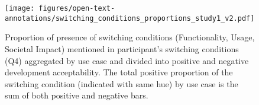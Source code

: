 \begin{figure}[!hptb]
    \centering
    \texttt{[image: figures/open-text-annotations/switching\_conditions\_proportions\_study1\_v2.pdf]}
    \caption{Proportion of presence of switching conditions (Functionality, Usage, Societal Impact) mentioned in participant's switching conditions (Q4) aggregated by use case and divided into positive and negative development acceptability. The total positive proportion of the switching condition (indicated with same hue) by use case is the sum of both positive and negative bars. }
    \label{fig:switching_conditions_proportions}
\end{figure}